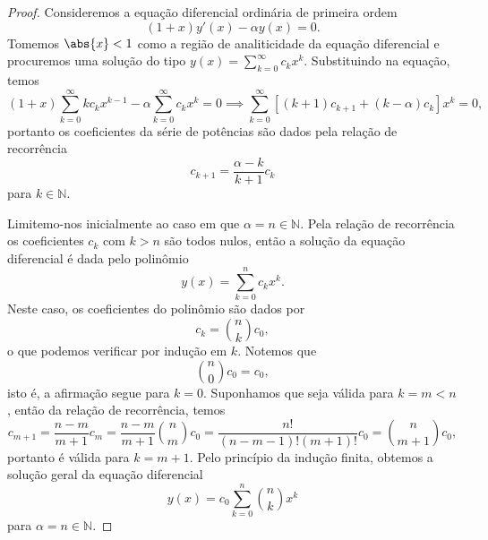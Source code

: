 \begin{proof}
    Consideremos a equação diferencial ordinária de primeira ordem
    \begin{equation*}
        (1 + x)y'(x) - \alpha y(x) = 0.
    \end{equation*}
    Tomemos \(\abs{x} < 1\) como a região de analiticidade da equação diferencial e procuremos uma solução do tipo \(y(x) = \sum_{k=0}^\infty c_k x^k\). Substituindo na equação, temos
    \begin{equation*}
        (1 + x) \sum_{k=0}^\infty kc_k x^{k-1} - \alpha \sum_{k = 0}^\infty c_kx^k = 0 \implies \sum_{k = 0}^\infty \left[(k+1)c_{k+1} + (k - \alpha)c_k \right] x^k = 0,
    \end{equation*}
    portanto os coeficientes da série de potências são dados pela relação de recorrência
    \begin{equation*}
        c_{k+1} = \frac{\alpha - k}{k+1}c_k
    \end{equation*}
    para \(k \in \mathbb{N}\).

    Limitemo-nos inicialmente ao caso em que \(\alpha = n \in \mathbb{N}\). Pela relação de recorrência os coeficientes \(c_k\) com \(k > n\) são todos nulos, então a solução da equação diferencial é dada pelo polinômio
    \begin{equation*}
        y(x) = \sum_{k = 0}^{n} c_k x^k.
    \end{equation*}
    Neste caso, os coeficientes do polinômio são dados por
    \begin{equation*}
        c_k = \binom{n}{k}c_0,
    \end{equation*}
    o que podemos verificar por indução em \(k\). Notemos que
    \begin{equation*}
        \binom{n}{0} c_0 = c_0,
    \end{equation*}
    isto é, a afirmação segue para \(k = 0\). Suponhamos que seja válida para \(k = m < n\), então da relação de recorrência, temos
    \begin{equation*}
        c_{m+1} = \frac{n - m}{m+1}c_m = \frac{n-m}{m+1} \binom{n}{m} c_0 = \frac{n!}{(n - m - 1)! (m+1)!} c_0 = \binom{n}{m+1} c_0,
    \end{equation*}
    portanto é válida para \(k = m + 1\). Pelo princípio da indução finita, obtemos a solução geral da equação diferencial
    \begin{equation*}
        y(x) = c_0 \sum_{k = 0}^{n} \binom{n}{k}x^k
    \end{equation*}
    para \(\alpha = n \in \mathbb{N}\).


\end{proof}
